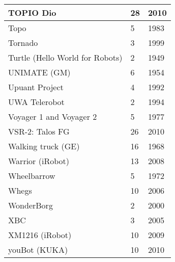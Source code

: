 \begin{longtable}{l | l | l }
TOPIO Dio	&	28	&	2010	\\	\hline
Topo	&	5	&	1983	\\	\hline
Tornado	&	3	&	1999	\\	\hline
Turtle (Hello World for Robots)	&	2	&	1949	\\	\hline
UNIMATE (GM)	&	6	&	1954	\\	\hline
Upuant Project	&	4	&	1992	\\	\hline
UWA Telerobot	&	2	&	1994	\\	\hline
Voyager 1 and Voyager 2	&	5	&	1977	\\	\hline
VSR-2: Talos FG	&	26	&	2010	\\	\hline
Walking truck (GE)	&	16	&	1968	\\	\hline
Warrior (iRobot)	&	13	&	2008	\\	\hline
Wheelbarrow	&	5	&	1972	\\	\hline
Whegs	&	10	&	2006	\\	\hline
WonderBorg	&	2	&	2000	\\	\hline
XBC	&	3	&	2005	\\	\hline
XM1216 (iRobot)	&	10	&	2009	\\	\hline
youBot (KUKA)	&	10	&	2010	\\	\hline
\end{longtable}

